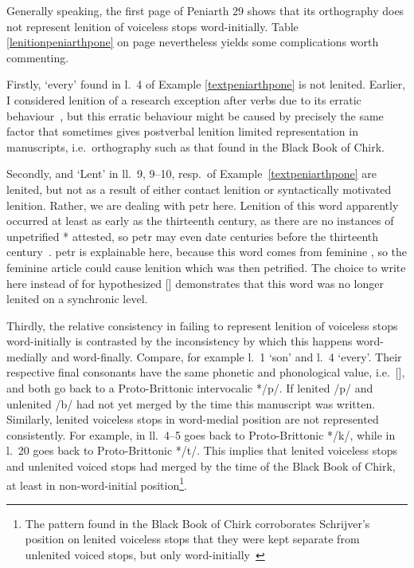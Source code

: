 Generally speaking, the first page of Peniarth 29 shows that its orthography does not represent lenition of voiceless stops word-initially. Table \ref{lenitionpeniarthpone} on page \pageref{lenitionpeniarthpone} nevertheless yields some complications worth commenting.

Firstly,  `every' found in l.~4 of Example \ref{textpeniarthpone} is not lenited. Earlier, I considered lenition of  a research exception after verbs due to its erratic behaviour~\parencite[24]{van_sluis_development_2014}, but this erratic behaviour might be caused by precisely the same factor that sometimes gives postverbal lenition limited representation in manuscripts, i.e.\ orthography such as that found in the Black Book of Chirk.

Secondly,  and  `Lent' in ll.~9, 9--10, resp.\ of Example~\ref{textpeniarthpone} are lenited, but not as a result of either contact lenition or syntactically motivated lenition. Rather, we are dealing with \gls{petr} here.
Lenition of this word apparently occurred at least as early as the thirteenth century, as there are no instances of unpetrified * attested, so \gls{petr} may even date centuries before the thirteenth century~\parencite[Grawys, Garawys]{bevan_geiriadur_2014}.
\Gls{petr} is explainable here, because this word comes from feminine , so the feminine article could cause lenition which was then petrified. The choice to write  here instead of  for hypothesized [\gd] demonstrates that this word was no longer lenited on a synchronic level. 

Thirdly, the relative consistency in failing to represent lenition of voiceless stops word-initially is contrasted by the inconsistency by which this happens word-medially and word-finally. Compare, for example l.~1  `son' and l.~4  `every'. Their respective final consonants have the same phonetic and phonological value, i.e.\ [\bd], and both go back to a Proto-Brittonic intervocalic */p/. If lenited /p/ and unlenited /b/ had not yet merged by the time this manuscript was written. Similarly, lenited voiceless stops in word-medial position are not represented consistently. For example,  in ll.~4–5  goes back to Proto-Brittonic */k/, while  in l.~20  goes back to Proto-Brittonic */t/. This implies that lenited voiceless stops and unlenited voiced stops had merged by the time of the Black Book of Chirk, at least in non-word-initial position\footnote{The pattern found in the Black Book of Chirk corroborates Schrijver's position on lenited voiceless stops that they were kept separate from unlenited voiced stops, but only word-initially~\autocite[31]{schrijver_old_2011}}.

